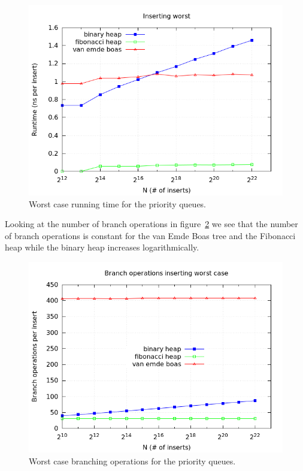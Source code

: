\documentclass[a4paper,oneside,article,11pt]{memoir}
\begin{document}
\begin{figure}[H]
\includegraphics[scale=0.5]{../res2/inserts/runtime_worst.png}
\caption{Worst case running time for the priority queues.}
\label{fig:insert_worst_running}
\end{figure}

Looking at the number of branch operations in figure~\ref{fig:insert_worst_branch} we see that the number of branch operations is constant for the van Emde Boas tree and the Fibonacci heap while the binary heap increases logarithmically.

\begin{figure}[H]
\includegraphics[scale=0.5]{../res2/inserts/branch_worst.png}
\caption{Worst case branching operations for the priority queues.}
\label{fig:insert_worst_branch}
\end{figure}
\end{document}
